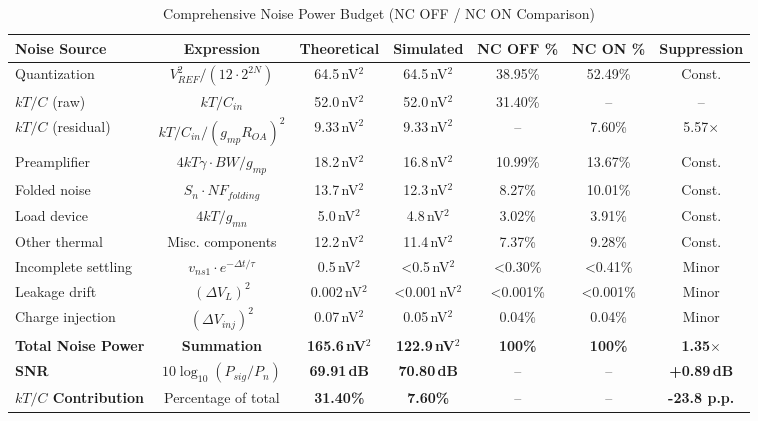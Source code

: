 \documentclass[journal]{IEEEtran}
\begin{document}
\begin{table}[!t]
\caption{Comprehensive Noise Power Budget (NC OFF / NC ON Comparison)}
\label{tab:noise_budget}
\centering
\footnotesize
\begin{tabular}{|l|c|c|c|c|c|c|}
\hline
\textbf{Noise Source} & \textbf{Expression} & \textbf{Theoretical} & \textbf{Simulated} & \textbf{NC OFF \%} & \textbf{NC ON \%} & \textbf{Suppression} \\
\hline
Quantization & $V_{REF}^2/(12\cdot 2^{2N})$ & 64.5\,nV$^2$ & 64.5\,nV$^2$ & 38.95\% & 52.49\% & Const. \\
\hline
$kT/C$ (raw) & $kT/C_{in}$ & 52.0\,nV$^2$ & 52.0\,nV$^2$ & 31.40\% & -- & -- \\
\hline
$kT/C$ (residual) & $kT/C_{in} / (g_{mp}R_{OA})^2$ & 9.33\,nV$^2$ & 9.33\,nV$^2$ & -- & 7.60\% & 5.57$\times$ \\
\hline
Preamplifier & $4kT\gamma \cdot BW/g_{mp}$ & 18.2\,nV$^2$ & 16.8\,nV$^2$ & 10.99\% & 13.67\% & Const. \\
\hline
Folded noise & $S_{n} \cdot NF_{folding}$ & 13.7\,nV$^2$ & 12.3\,nV$^2$ & 8.27\% & 10.01\% & Const. \\
\hline
Load device & $4kT/g_{mn}$ & 5.0\,nV$^2$ & 4.8\,nV$^2$ & 3.02\% & 3.91\% & Const. \\
\hline
Other thermal & Misc. components & 12.2\,nV$^2$ & 11.4\,nV$^2$ & 7.37\% & 9.28\% & Const. \\
\hline
Incomplete settling & $v_{ns1} \cdot e^{-\Delta t/\tau}$ & 0.5\,nV$^2$ & <0.5\,nV$^2$ & <0.30\% & <0.41\% & Minor \\
\hline
Leakage drift & $(\Delta V_L)^2$ & 0.002\,nV$^2$ & <0.001\,nV$^2$ & <0.001\% & <0.001\% & Minor \\
\hline
Charge injection & $(\Delta V_{inj})^2$ & 0.07\,nV$^2$ & 0.05\,nV$^2$ & 0.04\% & 0.04\% & Minor \\
\hline
\hline
\textbf{Total Noise Power} & \textbf{Summation} & \textbf{165.6\,nV$^2$} & \textbf{122.9\,nV$^2$} & \textbf{100\%} & \textbf{100\%} & \textbf{1.35$\times$} \\
\hline
\textbf{SNR} & $10\log_{10}(P_{sig}/P_n)$ & \textbf{69.91\,dB} & \textbf{70.80\,dB} & -- & -- & \textbf{+0.89\,dB} \\
\hline
\textbf{$kT/C$ Contribution} & Percentage of total & \textbf{31.40\%} & \textbf{7.60\%} & -- & -- & \textbf{-23.8 p.p.} \\
\hline
\end{tabular}
\end{table}
\end{document}
